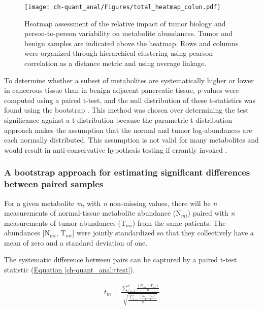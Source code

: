 \begin{figure}[h!]
\begin{center}
\texttt{[image: ch-quant\_anal/Figures/total\_heatmap\_colun.pdf]}
\caption[Heatmap assessment of the relative impact of tumor biology and person-to-person variability on metabolite abundances.]{Heatmap assessment of the relative impact of tumor biology and person-to-person variability on metabolite abundances.  Tumor and benign samples are indicated above the heatmap.  Rows and columns were organized through hierarchical clustering using pearson correlation as a distance metric and using average linkage.}
\label{ch-quant_anal:all_sample_heatmap}
\end{center}
\end{figure}

To determine whether a subset of metabolites are systematically higher or lower in cancerous tissue than in benign adjacent pancreatic tissue, p-values were computed using a paired t-test, and the null distribution of these t-statistics was found using the bootstrap \cite{Efron:1986cv}.  This method was chosen over determining the test significance against a t-distribution because the parametric t-distribution approach makes the assumption that the normal and tumor log-abundances are each normally distributed.  This assumption is not valid for many metabolites and would result in anti-conservative hypothesis testing if errantly invoked \cite{Schmoyeri:1996uh}.

\subsubsection{A bootstrap approach for estimating significant differences between paired samples}

For a given metabolite \textit{m}, with \textit{n} non-missing values, there will be \textit{n} measurements of normal-tissue metabolite abundance (N$_{mi}$) paired with \textit{n} measurements of tumor abundances (T$_{mi}$) from the same patients.  The abundances [N$_{mi}$, T$_{mi}$] were jointly standardized so that they collectively have a mean of zero and a standard deviation of one.  

The systematic difference between pairs can be captured by a paired t-test statistic (\hyperref[ch-quant_anal:ttest]{Equation \ref{ch-quant_anal:ttest}}).

\begin{align}
t_{m} = \frac{\sum_{i = 1}^{n}\frac{(N_{mi} - T_{mi})}{n}}{\sqrt{\frac{\sum_{i = 1}^{n}\frac{(N_{mi} - T_{mi})^{2}}{n-1}}{n}}}\label{ch-quant_anal:ttest}
\end{align}

